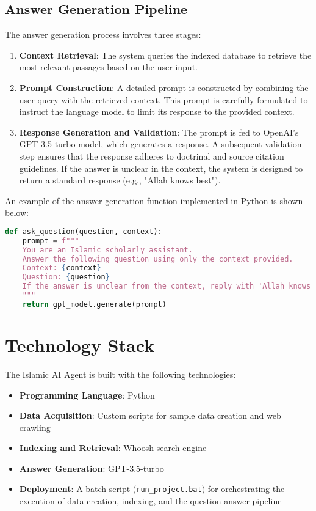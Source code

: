 \documentclass[12pt,a4paper]{article}
\begin{document}
\subsection{Answer Generation Pipeline}
The answer generation process involves three stages:
\begin{enumerate}
    \item \textbf{Context Retrieval}: The system queries the indexed database to retrieve the most relevant passages based on the user input.
    \item \textbf{Prompt Construction}: A detailed prompt is constructed by combining the user query with the retrieved context. This prompt is carefully formulated to instruct the language model to limit its response to the provided context.
    \item \textbf{Response Generation and Validation}: The prompt is fed to OpenAI's GPT-3.5-turbo model, which generates a response. A subsequent validation step ensures that the response adheres to doctrinal and source citation guidelines. If the answer is unclear in the context, the system is designed to return a standard response (e.g., "Allah knows best").
\end{enumerate}

An example of the answer generation function implemented in Python is shown below:
\begin{lstlisting}[language=Python, caption=Example of Answer Generation Function]
def ask_question(question, context):
    prompt = f"""
    You are an Islamic scholarly assistant.
    Answer the following question using only the context provided.
    Context: {context}
    Question: {question}
    If the answer is unclear from the context, reply with 'Allah knows best'.
    """
    return gpt_model.generate(prompt)
\end{lstlisting}

\section{Technology Stack}
The Islamic AI Agent is built with the following technologies:
\begin{itemize}
    \item \textbf{Programming Language}: Python
    \item \textbf{Data Acquisition}: Custom scripts for sample data creation and web crawling
    \item \textbf{Indexing and Retrieval}: Whoosh search engine
    \item \textbf{Answer Generation}: GPT-3.5-turbo 
    \item \textbf{Deployment}: A batch script (\texttt{run_project.bat}) for orchestrating the execution of data creation, indexing, and the question-answer pipeline
\end{itemize}
\end{document}
